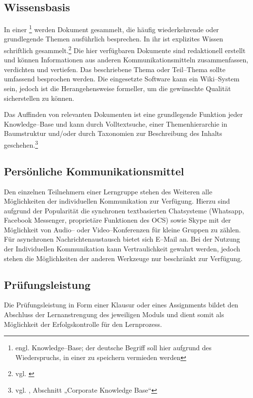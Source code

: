 \subsection{Wissensbasis} %
\label{sub:knowledge_bases}
In einer \footnote{engl. Knowledge–Base; der deutsche Begriff  soll hier aufgrund des Wiederspruchs,  in einer  zu speichern vermieden werden} werden Dokument gesammelt, die häufig wiederkehrende oder grundlegende Themen ausführlich besprechen. In ihr ist explizites Wissen schriftlich gesammelt.\footnote{vgl. \cite{wp:kb}} Die hier verfügbaren Dokumente sind redaktionell erstellt und können Informationen aus  anderen Kommunikationsmitteln zusammenfassen, verdichten und vertiefen. Das beschriebene Thema oder Teil–Thema sollte umfassend besprochen werden. Die eingesetzte Software kann ein Wiki--System sein, jedoch ist die Herangehensweise formeller, um die gewünschte Qualität sicherstellen zu können.

Das Auffinden von relevanten Dokumenten ist eine grundlegende Funktion jeder Knowledge–Base und kann durch Volltextsuche, einer Themenhierarchie in Baumstruktur und/oder durch Taxonomien zur Beschreibung des Inhalts geschehen.\footnote{vgl. \cite{altwies}, Abschnitt „Corporate Knowledge Base“}


\subsection{Persönliche Kommunikationsmittel} %
\label{sub:personliche_kommunikationsmittel}
Den einzelnen Teilnehmern einer Lerngruppe stehen des Weiteren alle Möglichkeiten der individuellen Kommunikation zur Verfügung. Hierzu sind aufgrund der Popularität die synchronen textbasierten Chatsysteme (Whatsapp, Facebook Messenger, proprietäre Funktionen des \ac{OCS}) sowie Skype mit der Möglichkeit von Audio– oder Video–Konferenzen für kleine Gruppen zu zählen. Für asynchronen Nachrichtenaustausch bietet sich E–Mail an. Bei der Nutzung der Individuellen Kommunikation kann Vertraulichkeit gewahrt werden, jedoch stehen die Möglichkeiten der anderen Werkzeuge nur beschränkt zur Verfügung. 

\subsection{Prüfungsleistung} %
\label{sub:prufungsleistung}
Die Prüfungsleistung in Form einer Klausur oder eines Assignments bildet den Abschluss der Lernanstrengung des jeweiligen Moduls und dient somit als Möglichkeit der Erfolgskontrolle für den Lernprozess.

